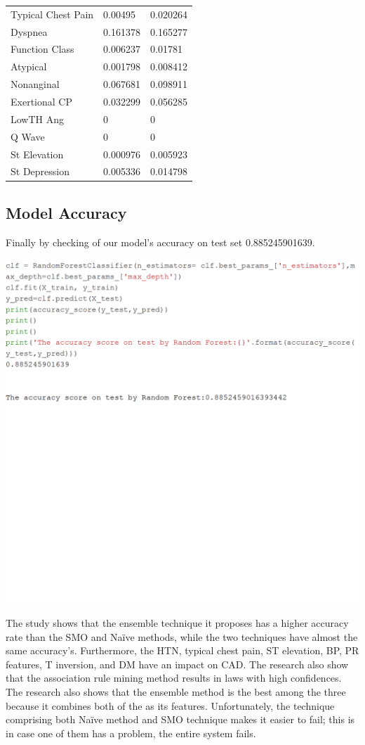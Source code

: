 \documentclass[sigconf]{acmart}
\begin{document}
\begin{table}[]
\begin{tabular}{lll}
Typical Chest Pain    & 0.00495  & 0.020264 \\
Dyspnea               & 0.161378 & 0.165277 \\
Function Class        & 0.006237 & 0.01781  \\
Atypical              & 0.001798 & 0.008412 \\
Nonanginal            & 0.067681 & 0.098911 \\
Exertional CP         & 0.032299 & 0.056285 \\
LowTH Ang             & 0        & 0        \\
Q Wave                & 0        & 0        \\
St Elevation          & 0.000976 & 0.005923 \\
St Depression         & 0.005336 & 0.014798
\end{tabular}
\end{table}

\subsection{Model Accuracy}  

Finally by checking of our model's accuracy on test set 0.885245901639.

\includegraphics[width=0.95\columnwidth]{project/images/Untitled7.png}

The study shows that the ensemble technique it proposes has a higher accuracy rate than the SMO and Naïve methods, while the two techniques have almost the same accuracy's. Furthermore, the HTN, typical chest pain, ST elevation, BP, PR features, T inversion, and DM have an impact on CAD. The research also show that the association rule mining method results in laws with high confidences. The research also shows that the ensemble method is the best among the three because it combines both of the as its features. Unfortunately, the technique comprising both Naïve method and SMO technique makes it easier to fail; this is in case one of them has a problem, the entire system fails.
\end{document}
